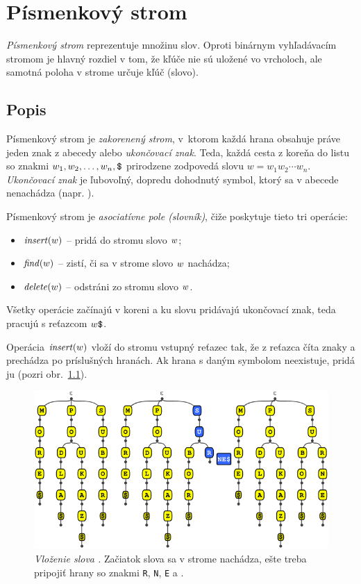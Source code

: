 
\chapter{Písmenkový strom}\label{chap:trie}

\emph{Písmenkový strom} reprezentuje množinu slov. Oproti binárnym 
vyhľadávacím stromom je hlavný rozdiel v tom, že kľúče nie sú uložené 
vo vrcholoch, ale samotná poloha v strome určuje kľúč (slovo). 

\section{Popis}
Písmenkový strom je \emph{zakorenený strom}, v~ktorom každá hrana obsahuje 
práve jeden znak z abecedy alebo \emph{ukončovací znak}. Teda, každá cesta 
z koreňa do listu so znakmi $w_1, w_2, \ldots, w_n, \hbox{\tt\$}$ prirodzene 
zodpovedá slovu $w=w_1w_2\cdots w_n$. \emph{Ukončovací znak} je ľubovoľný, 
dopredu dohodnutý symbol, ktorý sa v abecede nenachádza (napr. \uz). 

Písmenkový strom je \emph{asociatívne pole (slovník)}, čiže 
poskytuje tieto tri operácie:
\begin{itemize}
\item $\mathop{\mathit{insert}}(w)$ -- pridá do stromu slovo $w$;
\item $\mathop{\mathit{find}}(w)$ -- zistí, či sa v strome slovo $w$ nachádza;
\item $\mathop{\mathit{delete}}(w)$ -- odstráni zo stromu slovo $w$.
\end{itemize}
Všetky operácie začínajú v koreni a ku slovu pridávajú ukončovací znak, 
teda pracujú s reťazcom $w\hbox{\tt\$}$. 

Operácia $\mathop{\mathit{insert}}(w)$ vloží do stromu vstupný reťazec tak, že z reťazca číta znaky 
a prechádza po príslušných hranách. Ak hrana s daným symbolom neexistuje, 
pridá ju (pozri obr.~\ref{img:trieinsert}).

\begin{figure}
\centering
\includegraphics[width=0.9\columnwidth]{obrazky/trieinsertsmall.png}
\caption{\emph{Vloženie slova .} Začiatok slova 
 sa v strome nachádza, ešte treba pripojiť hrany 
so znakmi {\tt R}, {\tt N}, {\tt E} a \uz.} 
\label{img:trieinsert} 
\end{figure}

